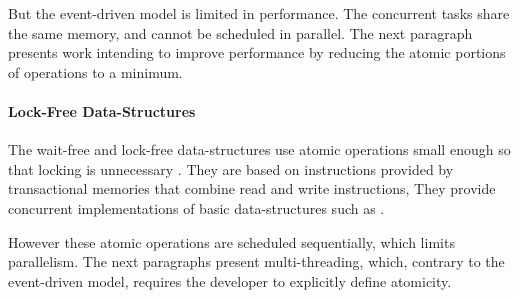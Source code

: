 



But the event-driven model is limited in performance.
The concurrent tasks share the same memory, and cannot be scheduled in parallel.
The next paragraph presents work intending to improve performance by reducing the atomic portions of operations to a minimum. %

\paragraph{Lock-Free Data-Structures}

The wait-free and lock-free data-structures use atomic operations small enough so that locking is unnecessary \cite{Lamport1977,Herlihy1988,Herlihy1990,Herlihy1991,Anderson1990}.
They are based on instructions provided by transactional memories \cite{Harris2010} that combine read and write instructions,
They provide concurrent implementations of basic data-structures such as .

However these atomic operations are scheduled sequentially, which limits parallelism.
The next paragraphs present multi-threading, which, contrary to the event-driven model, requires the developer to explicitly define atomicity.

